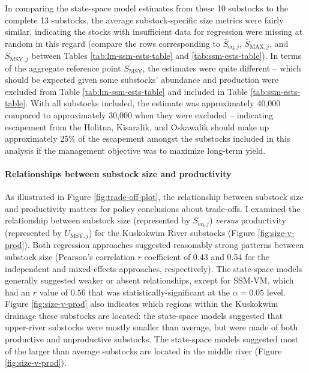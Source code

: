 \documentclass[12pt,]{book}
\let\oldparagraph\paragraph
\renewcommand{\paragraph}[1]{\oldparagraph{#1}\mbox{}}
\theoremstyle{definition}
\theoremstyle{definition}
\theoremstyle{definition}
\theoremstyle{remark}
\begin{document}
In comparing the state-space model estimates from these 10 substocks to
the complete 13 substocks, the average substock-specific size metrics
were fairly similar, indicating the stocks with insufficient data for
regression were missing at random in this regard (compare the rows
corresponding to \(\bar{S}_{\text{eq},j}\), \(\bar{S}_{\text{MAX},j}\),
and \(\bar{S}_{\text{MSY},j}\) between Tables
\ref{tab:lm-ssm-ests-table} and \ref{tab:ssm-ests-table}). In terms of
the aggregate reference point \(S_{\text{MSY}}\), the estimates were
quite different -- which should be expected given some substocks'
abundance and production were excluded from Table
\ref{tab:lm-ssm-ests-table} and included in Table
\ref{tab:ssm-ests-table}. With all substocks included, the estimate was
approximately 40,000 compared to approximately 30,000 when they were
excluded -- indicating escapement from the Holitna, Kisaralik, and
Oskawalik should make up approximately 25\% of the escapement amongst
the substocks included in this analysis if the management objective was
to maximize long-term yield.

\paragraph{Relationships between substock size and
productivity}\label{relationships-between-substock-size-and-productivity}

\noindent
As illustrated in Figure \ref{fig:trade-off-plot}, the relationship
between substock size and productivity matters for policy conclusions
about trade-offs. I examined the relationship between substock size
(represented by \(S_{\text{eq},j}\)) \emph{versus} productivity
(represented by \(U_{\text{MSY},j}\)) for the Kuskokwim River substocks
(Figure \ref{fig:size-v-prod}). Both regression approaches suggested
reasonably strong patterns between substock size (Pearson's correlation
\(r\) coefficient of 0.43 and 0.54 for the independent and mixed-effects
approaches, respectively). The state-space models generally suggested
weaker or absent relationships, except for SSM-VM, which had an \(r\)
value of 0.56 that was statistically-significant at the
\(\alpha = 0.05\) level. Figure \ref{fig:size-v-prod} also indicates
which regions within the Kuskokwim drainage these substocks are located:
the state-space models suggested that upper-river substocks were mostly
smaller than average, but were made of both productive and unproductive
substocks. The state-space models suggested most of the larger than
average substocks are located in the middle river (Figure
\ref{fig:size-v-prod}).
\end{document}
